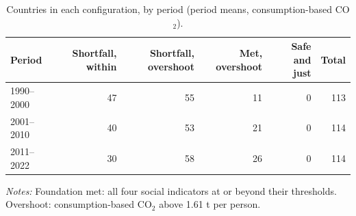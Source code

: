 \begin{table}[tbp]
\centering
\small
\caption{Countries in each configuration, by period (period means, consumption-based CO$_2$).}
\label{tab:counts}
\begin{threeparttable}
\begin{tabular}{lrrrrr}
\toprule
Period & Shortfall, within & Shortfall, overshoot & Met, overshoot & Safe and just & Total \\
\midrule
1990–2000 & 47 & 55 & 11 & 0 & 113 \\
2001–2010 & 40 & 53 & 21 & 0 & 114 \\
2011–2022 & 30 & 58 & 26 & 0 & 114 \\
\bottomrule
\end{tabular}
\begin{tablenotes}[flushleft]
\footnotesize
\item \textit{Notes:} Foundation met: all four social indicators at or beyond their thresholds. Overshoot: consumption-based CO$_2$ above 1.61 t per person.
\end{tablenotes}
\end{threeparttable}
\end{table}
